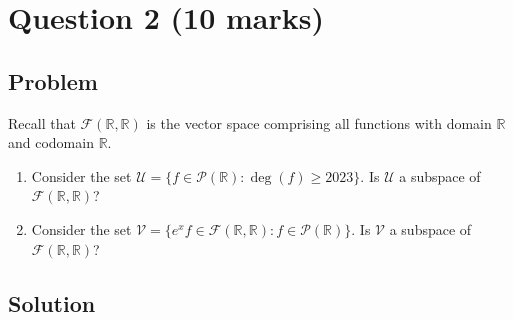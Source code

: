 \documentclass[12pt]{article}
\begin{document}
\newpage
\section{Question 2 \hfill (10 marks)}

\subsection{Problem}
Recall that $\mathcal{F}(\mathbb{R},\mathbb{R})$ is the vector space comprising all functions with domain $\mathbb{R}$ and codomain $\mathbb{R}$.
\begin{enumerate}[label=(\alph*)]
\item Consider the set $\mathcal{U}=\{f\in \mathcal{P}(\mathbb{R}) : \deg(f)\ge 2023\}$. Is $\mathcal{U}$ a subspace of $\mathcal{F}(\mathbb{R},\mathbb{R})$?
\item Consider the set $\mathcal{V}=\{e^x f\in \mathcal{F}(\mathbb{R},\mathbb{R}) : f\in \mathcal{P}(\mathbb{R})\}$. Is $\mathcal{V}$ a subspace of $\mathcal{F}(\mathbb{R},\mathbb{R})$?
\end{enumerate}

\subsection{Solution}
\end{document}
